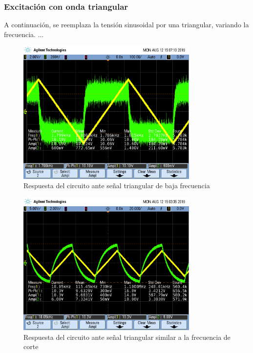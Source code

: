 \documentclass[11pt, a4paper]{article}
\begin{document}
\subsubsection*{Excitación con onda triangular}
A continuación, se reemplaza la tensión sinusoidal por una triangular, variando la frecuencia. ...

\begin{figure}[H]
	\centering
	\includegraphics[width=0.8\textwidth,trim={0.5cm 5cm  1 5cm},clip]{rta_onda_triang_baja_f.png}
	\caption{Respuesta del circuito ante señal triangular de baja frecuencia} 
	\label{graf:rta_onda_triang_baja_f}
\end{figure}

\begin{figure}[H]
	\centering
	\includegraphics[width=0.8\textwidth,trim={0.5cm 5cm  1 5cm},clip]{rta_onda_triang_fc2.png}
	\caption{Respuesta del circuito ante señal triangular similar a la frecuencia de corte} 
	\label{graf:rta_onda_triang_fc}
\end{figure}
\end{document}
